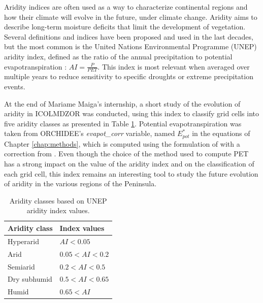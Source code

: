 Aridity indices are often used as a way to characterize continental regions and how their climate will evolve in the future, under climate change. Aridity aims to describe long-term moisture deficits that limit the development of vegetation. Several definitions and indices have been proposed and used in the last decades, but the most common is the United Nations Environmental Programme (UNEP) aridity index, defined as the ratio of the annual precipitation to potential evapotranspiration : $AI = \frac{P}{PET}$. %
This index is most relevant when averaged over multiple years to reduce sensitivity to specific droughts or extreme precipitation events.

At the end of Mariame Maiga's internship, a short study of the evolution of aridity in ICOLMDZOR was conducted, using this index to classify grid cells into five aridity classes as presented in Table \ref{table:aridity_classes}. 
Potential evapotranspiration was taken from ORCHIDEE's \textit{evapot\_corr} variable, named $E_{pot}^*$ in the equations of Chapter \ref{chap:methods}, which is computed using the formulation of \citet{Budyko_1956} with a correction from \citet{milly_potential_1992}. 
Even though the choice of the method used to compute PET has a strong impact on the value of the aridity index and on the classification of each grid cell, this index remains an interesting tool to study the future evolution of aridity in the various regions of the Peninsula.

\begin{table}[h]
    \centering
    \begin{tabular}{|l|l|}
        \hline
        \textbf{Aridity class} & \textbf{Index values} \\
        \hline
        Hyperarid & \( AI < 0.05 \) \\
        \hline
        Arid & \( 0.05 < AI < 0.2 \) \\
        \hline
        Semiarid & \( 0.2 < AI < 0.5 \) \\
        \hline
        Dry subhumid & \( 0.5 < AI < 0.65 \) \\
        \hline
        Humid & \( 0.65 < AI \) \\
        \hline
    \end{tabular}
    \caption{Aridity classes based on UNEP aridity index values.}
    \label{table:aridity_classes}
\end{table}

